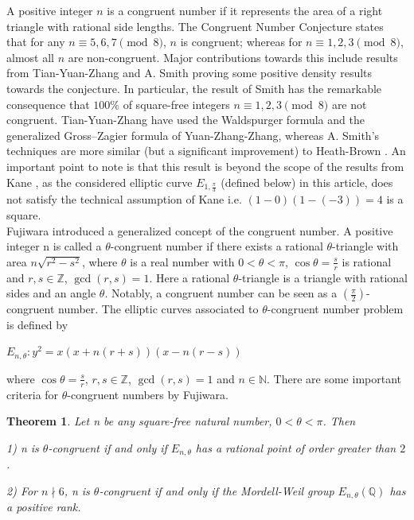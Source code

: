 \documentclass[11pt]{article}
\newcommand{\Z}{ {\mathbb{Z}} }
\newcommand{\Q}{ {\mathbb{Q}} }
\newtheorem{theorem}{Theorem}[section]
\begin{document}
\noindent A positive integer \(n\) is a congruent number if it represents the area of a right triangle with rational side lengths. The Congruent Number Conjecture states that for any \(n \equiv 5, 6, 7 \pmod{8}\), \(n\) is congruent; whereas for \(n \equiv 1, 2, 3 \pmod{8}\), almost all \(n\) are non-congruent. Major contributions towards this include results from Tian-Yuan-Zhang \cite{TYZ17} and A. Smith \cite{Smith17} proving some positive density results towards the conjecture.  In particular, the result of Smith has the remarkable consequence that $100\%$ of square-free integers \(n \equiv 1, 2, 3 \pmod{8}\) are not congruent. Tian-Yuan-Zhang \cite{TYZ17} have used the Waldspurger formula and the generalized Gross--Zagier formula of Yuan-Zhang-Zhang, whereas A. Smith's techniques \cite{Smith17} are more similar (but a significant improvement) to   Heath-Brown \cite{HeathBrown}. An important point to note is that this result is beyond the scope of the results from Kane \cite{Kane}, as the considered elliptic curve $E_{1,\frac{\pi}{3}}$ (defined below) in this article, does not satisfy the technical assumption of Kane i.e. $(1-0)(1-(-3))=4$ is a square.
\\





\noindent Fujiwara {\cite{Fujiwara}} introduced a generalized concept of the congruent number. A positive integer n is called a $\theta$-congruent number if there exists a rational $\theta$-triangle with area $n\sqrt{r^{2}-s^{2}}$, where $\theta$ is a real number with $0<\theta<\pi$, $\cos \theta=\frac{s}{r}$ is rational and $r,s\in \Z$, $\gcd(r,s)=1$.
Here a rational $\theta$-triangle is a triangle with rational sides and an angle $\theta$. 
Notably, a congruent number can be seen as a $(\frac{\pi}{2})$-congruent number. The elliptic curves associated to $\theta$-congruent number problem is defined by \begin{center}
$E_{n,\theta} : y^{2} = x(x+n(r+s))(x-n(r-s))$
\end{center}
where $\cos \theta=\frac{s}{r}$, $r,s\in \mathbb{Z}$, $\gcd(r,s)=1$ and $n\in \mathbb{N}$. There are some important criteria for $\theta$-congruent numbers by Fujiwara.
\begin{theorem}{\cite{Fujiwara}}
Let n be any square-free natural number, $0<\theta<\pi$. Then
\item 1) n is $\theta$-congruent if and only if $E_{n,\theta}$ has a rational point of order greater than $2$.
\item 2) For $n\nmid 6$, n is $\theta$-congruent if and only if the Mordell-Weil group $E_{n,\theta}(\Q)$ has a positive rank.   
\end{theorem}
\end{document}
